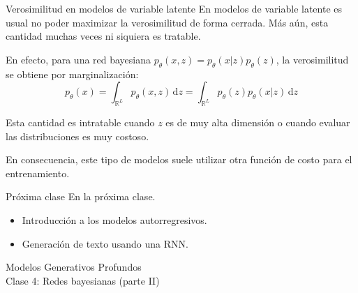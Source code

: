 \documentclass{beamer}
\newcommand{\R}{\mathbb{R}}
\begin{document}
\begin{frame}{Verosimilitud en modelos de variable latente}
    En modelos de variable latente es usual no poder maximizar la verosimilitud de forma cerrada. Más aún, esta cantidad muchas veces ni siquiera es tratable.

    En efecto, para una red bayesiana $p_\theta(x,z)=p_\theta(x|z)p_\theta(z)$, la verosimilitud se obtiene por marginalización:
    \begin{equation*}
        p_\theta(x)=\int_{\R^L} p_\theta(x,z)\,\text{d}z
        =\int_{\R^L} p_\theta(z)p_\theta(x|z)\,\text{d}z
    \end{equation*}

Esta cantidad es intratable cuando $z$ es de muy alta dimensión o cuando evaluar las distribuciones es muy costoso.

En consecuencia, este tipo de modelos suele utilizar otra función de costo para el entrenamiento.
\end{frame}


\begin{frame}{Próxima clase}
    En la próxima clase.
    \begin{itemize}
        \item Introducción a los modelos autorregresivos.
        \item Generación de texto usando una RNN.
    \end{itemize}
\end{frame}

\begin{frame}
    \centering
    \Large{Modelos Generativos Profundos}\\
    \large{Clase 4: Redes bayesianas (parte II)}
\end{frame}
\end{document}
